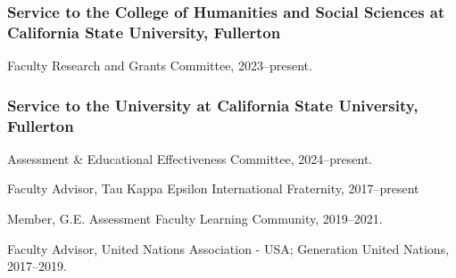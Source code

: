 \documentclass[12pt,letterpaper]{article}
\renewenvironment{itemize}{
  \begin{list}{}{
    \setlength{\leftmargin}{1.5em}
    \setlength{\itemsep}{0.25em}
    \setlength{\parskip}{0pt}
    \setlength{\parsep}{0.25em}
  }
}{
  \end{list}
}
\begin{document}
\subsubsection*{Service to the College of Humanities and Social Sciences at California State University, Fullerton}
\begin{itemize}\leftmargin=2pt\itemindent=-15pt
    \item Faculty Research and Grants Committee, 2023--present.
\end{itemize}

\subsubsection*{Service to the University at California State University, Fullerton}
\begin{itemize}\leftmargin=2pt\itemindent=-15pt
    \item Assessment \& Educational Effectiveness Committee, 2024--present.
    \item Faculty Advisor, Tau Kappa Epsilon International Fraternity, 2017--present
    \item Member, G.E. Assessment Faculty Learning Community, 2019--2021.
    \item Faculty Advisor, United Nations Association - USA; Generation United Nations, 2017--2019.
\end{itemize}
\end{document}
